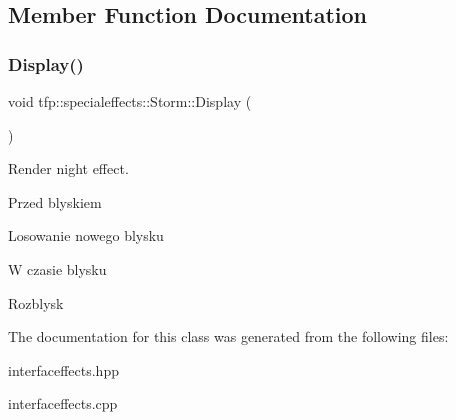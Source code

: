 \subsection{Member Function Documentation}
\mbox{\label{classtfp_1_1specialeffects_1_1_storm_a7738c13805a19b1146b1f77c5e5f4886}} 
\subsubsection{\texorpdfstring{Display()}{Display()}}
{\footnotesize\ttfamily void tfp\+::specialeffects\+::\+Storm\+::\+Display (\begin{DoxyParamCaption}{ }\end{DoxyParamCaption})}



Render night effect. 

Przed blyskiem

Losowanie nowego blysku

W czasie blysku

Rozblysk 

The documentation for this class was generated from the following files\+:\begin{DoxyCompactItemize}
\item 
interfaceffects.\+hpp\item 
interfaceffects.\+cpp\end{DoxyCompactItemize}
